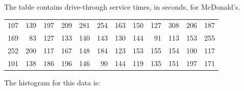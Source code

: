 \documentclass{beamer}
\begin{document}
\begin{frame}
\begin{example}
The table contains drive-through service times, in seconds, for McDonald's.
\begin{center}
\begin{tabular}{rrrrrrrrrrrr}
107 & 139 & 197 & 209 & 281 & 254 & 163 & 150 & 127 & 308 & 206 & 187 \\
169 &  83 & 127 & 133 & 140 & 143 & 130 & 144 &  91 & 113 & 153 & 255 \\
252 & 200 & 117 & 167 & 148 & 184 & 123 & 153 & 155 & 154 & 100 & 117 \\
101 & 138 & 186 & 196 & 146 &  90 & 144 & 119 & 135 & 151 & 197 & 171 \\
\end{tabular}
\end{center}
The histogram for this data is:


\end{example}
\end{frame}
\end{document}
